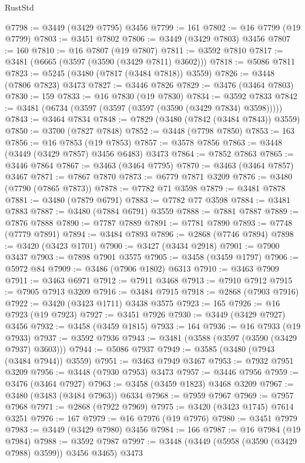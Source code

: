 \begin{lexlean}{RustStd}
\begin{coremodule}
{\begin{coremodule}
{{{{{{{{{{{{{{{{{{{{{{{{{{{{{{{{{{{{{{{{{{{{{{{{{{{{{{{{{{{{{{{{{{{{{{{{{{{{{{{{{{{{{@7798 := @3449 (@3429 @7795) @3456
@7799 := 161
@7802 := @16 @7799 (@19 @7799)
@7803 := @3451 @7802
@7806 := @3449 (@3429 @7803) @3456
@7807 := 160
@7810 := @16 @7807 (@19 @7807)
@7811 := @3592 @7810
@7817 := @3481 (@6665 (@3597 (@3590 (@3429 @7811) @3602)))
@7818 := @5086 @7811
@7823 := @5245 (@3480 (@7817 (@3484 @7818)) @3559)
@7826 := @3448 (@7806 @7823) @3473
@7827 := @3446 @7826
@7829 := @3476 (@3464 @7803)
@7830 := 159
@7833 := @16 @7830 (@19 @7830)
@7834 := @3592 @7833
@7842 := @3481 (@6734 (@3597 (@3597 (@3597 (@3590 (@3429 @7834) @3598)))))
@7843 := @3464 @7834
@7848 := @7829 (@3480 (@7842 (@3484 @7843)) @3559)
@7850 := @3700 (@7827 @7848)
@7852 := @3448 (@7798 @7850)
@7853 := 163
@7856 := @16 @7853 (@19 @7853)
@7857 := @3578 @7856
@7863 := @3448 (@3449 (@3429 @7857) @3456 @6483) @3473
@7864 := @7852 @7863
@7865 := @3446 @7864
@7867 := @3463 (@3464 @7795)
@7870 := @3463 (@3464 @7857) @3467
@7871 := @7867 @7870
@7873 := @6779 @7871 @3209
@7876 := @3480 (@7790 (@7865 @7873))
@7878 := @7782 @71 @3598
@7879 := @3481 @7878
@7881 := @3480 (@7879 @6791)
@7883 := @7782 @77 @3598
@7884 := @3481 @7883
@7887 := @3480 (@7884 @6791) @3559
@7888 := @7881 @7887
@7889 := @7876 @7888
@7890 := @7787 @7889
@7891 := @7781 @7890
@7893 := @7748 (@7779 @7891)
@7894 := @3484 @7893
@7896 := @2868 (@7746 @7894)
@7898 := @3420 (@3423 @1701)
@7900 := @3427 (@3434 @2918)
@7901 := @7900 @3437
@7903 := @7898 @7901 @3575
@7905 := @3458 (@3459 @1797)
@7906 := @5972 @84
@7909 := @3486 (@7906 @1802) @6313
@7910 := @3463 @7909
@7911 := @3463 @6971
@7912 := @7911 @3468
@7913 := @7910 @7912
@7915 := @7905 @7913 @3209
@7916 := @3484 @7915
@7918 := @2868 (@7903 @7916)
@7922 := @3420 (@3423 @1711) @3438 @3575
@7923 := 165
@7926 := @16 @7923 (@19 @7923)
@7927 := @3451 @7926
@7930 := @3449 (@3429 @7927) @3456
@7932 := @3458 (@3459 @1815)
@7933 := 164
@7936 := @16 @7933 (@19 @7933)
@7937 := @3592 @7936
@7943 := @3481 (@3588 (@3597 (@3590 (@3429 @7937) @3603)))
@7944 := @5086 @7937
@7949 := @3585 (@3480 (@7943 (@3484 @7944)) @3559)
@7951 := @3463 @7949 @3467
@7953 := @7932 @7951 @3209
@7956 := @3448 (@7930 @7953) @3473
@7957 := @3446 @7956
@7959 := @3476 (@3464 @7927)
@7963 := @3458 (@3459 @1823) @3468 @3209
@7967 := @3480 (@3483 (@3484 @7963)) @6334
@7968 := @7959 @7967
@7969 := @7957 @7968
@7971 := @2868 (@7922 @7969)
@7975 := @3420 (@3423 @1745) @7614 @3251
@7976 := 167
@7979 := @16 @7976 (@19 @7976)
@7980 := @3451 @7979
@7983 := @3449 (@3429 @7980) @3456
@7984 := 166
@7987 := @16 @7984 (@19 @7984)
@7988 := @3592 @7987
@7997 := @3448 (@3449 (@5958 (@3590 (@3429 @7988) @3599)) @3456 @3465) @3473
}}}}}}}}}}}}}}}}}}}}}}}}}}}}}}}}}}}}}}}}}}}}}}}}}}}}}}}}}}}}}}}}}}}}}}}}}}}}}}}}}}}}}
\end{coremodule}}
\end{coremodule}
\end{lexlean}
